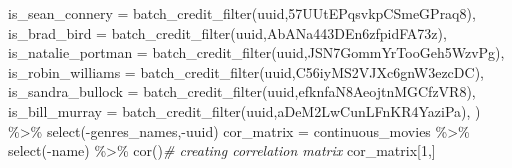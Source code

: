 \documentclass[
]{article}
\newenvironment{Shaded}{\begin{snugshade}}{\end{snugshade}}
\newcommand{\AttributeTok}[1]{\textcolor[rgb]{0.77,0.63,0.00}{#1}}
\newcommand{\CommentTok}[1]{\textcolor[rgb]{0.56,0.35,0.01}{\textit{#1}}}
\newcommand{\DecValTok}[1]{\textcolor[rgb]{0.00,0.00,0.81}{#1}}
\newcommand{\FunctionTok}[1]{\textcolor[rgb]{0.00,0.00,0.00}{#1}}
\newcommand{\NormalTok}[1]{#1}
\newcommand{\OtherTok}[1]{\textcolor[rgb]{0.56,0.35,0.01}{#1}}
\newcommand{\SpecialCharTok}[1]{\textcolor[rgb]{0.00,0.00,0.00}{#1}}
\newcommand{\StringTok}[1]{\textcolor[rgb]{0.31,0.60,0.02}{#1}}
\begin{document}
\begin{Shaded}
\begin{Highlighting}[]
    \AttributeTok{is\_sean\_connery =} \FunctionTok{batch\_credit\_filter}\NormalTok{(uuid,}\StringTok{\textquotesingle{}57UUtEPqsvkpCSmeGPraq8\textquotesingle{}}\NormalTok{),}
    \AttributeTok{is\_brad\_bird =} \FunctionTok{batch\_credit\_filter}\NormalTok{(uuid,}\StringTok{\textquotesingle{}AbANa443DEn6zfpidFA73z\textquotesingle{}}\NormalTok{),}
    \AttributeTok{is\_natalie\_portman =} \FunctionTok{batch\_credit\_filter}\NormalTok{(uuid,}\StringTok{\textquotesingle{}JSN7GommYrTooGeh5WzvPg\textquotesingle{}}\NormalTok{),}
    \AttributeTok{is\_robin\_williams =} \FunctionTok{batch\_credit\_filter}\NormalTok{(uuid,}\StringTok{\textquotesingle{}C56iyMS2VJXc6gnW3ezcDC\textquotesingle{}}\NormalTok{),}
    \AttributeTok{is\_sandra\_bullock =} \FunctionTok{batch\_credit\_filter}\NormalTok{(uuid,}\StringTok{\textquotesingle{}efknfaN8AeojtnMGCfzVR8\textquotesingle{}}\NormalTok{),}
    \AttributeTok{is\_bill\_murray =} \FunctionTok{batch\_credit\_filter}\NormalTok{(uuid,}\StringTok{\textquotesingle{}aDeM2LwCunLFnKR4YaziPa\textquotesingle{}}\NormalTok{),}
\NormalTok{  ) }\SpecialCharTok{\%\textgreater{}\%} \FunctionTok{select}\NormalTok{(}\SpecialCharTok{{-}}\NormalTok{genres\_names,}\SpecialCharTok{{-}}\NormalTok{uuid)}
\NormalTok{cor\_matrix }\OtherTok{=}\NormalTok{ continuous\_movies }\SpecialCharTok{\%\textgreater{}\%} \FunctionTok{select}\NormalTok{(}\SpecialCharTok{{-}}\NormalTok{name) }\SpecialCharTok{\%\textgreater{}\%} \FunctionTok{cor}\NormalTok{()}\CommentTok{\# creating correlation matrix}
\NormalTok{cor\_matrix[}\DecValTok{1}\NormalTok{,]}
\end{Highlighting}
\end{Shaded}
\end{document}
